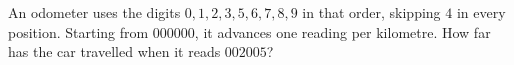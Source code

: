 An odometer uses the digits $0,1,2,3,5,6,7,8,9$ in that order, skipping $4$ in every position. Starting from $000000$, it advances one reading per kilometre. How far has the car travelled when it reads $002005$?
